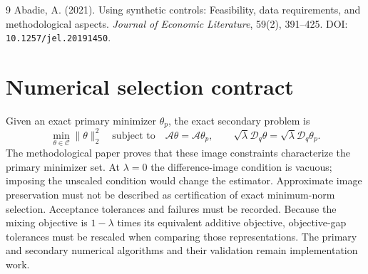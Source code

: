 \documentclass[11pt]{article}
\begin{document}
\begin{thebibliography}{9}
Abadie, A. (2021). Using synthetic controls: Feasibility, data requirements,
and methodological aspects. \emph{Journal of Economic Literature},
59(2), 391--425. DOI: \nolinkurl{10.1257/jel.20191450}.
\end{thebibliography}

\appendix
\section{Numerical selection contract}\label{app:selection}
Given an exact primary minimizer $\theta_p$, the exact secondary problem is
\[
 \min_{\theta\in\mathcal C}\|\theta\|_2^2
 \quad\text{subject to}\quad
 \mathcal A\theta=\mathcal A\theta_p,\qquad
 \sqrt\lambda\mathcal D_q\theta=\sqrt\lambda\mathcal D_q\theta_p.
\]
The methodological paper proves that these image constraints characterize
the primary minimizer set. At $\lambda=0$ the difference-image condition is
vacuous; imposing the unscaled condition would change the estimator.
Approximate image preservation must not be described as certification of
exact minimum-norm selection. Acceptance tolerances and failures must be
recorded. Because the mixing objective is $1-\lambda$ times its equivalent
additive objective, objective-gap tolerances must be rescaled when comparing
those representations. The primary and secondary numerical algorithms
and their validation remain implementation work.
\end{document}
